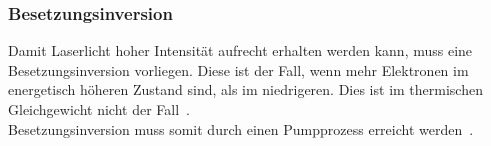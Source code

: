         \subsubsection{Besetzungsinversion}
            Damit Laserlicht hoher Intensität aufrecht erhalten werden kann, muss eine Besetzungsinversion vorliegen. 
            Diese ist der Fall, wenn mehr Elektronen im energetisch höheren Zustand sind, als im niedrigeren. 
            Dies ist im thermischen Gleichgewicht nicht der Fall~\cite[288-289]{möller_2003}. 
            \\
            Besetzungsinversion muss somit durch einen Pumpprozess erreicht werden~\cite[401 f.]{haken_wolf_2004}.%
            \\
